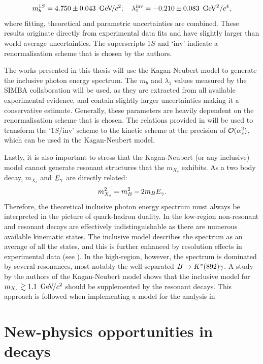 \begin{equation}\label{eq:simba_result}
    m_b^{1S} =4.750 \pm 0.043~{\mathrm{\,Ge\kern -0.1em V\!/}c^2};  \quad \lambda^{\mathrm{inv}}_1 = -0.210\pm0.083~\mathrm{\,Ge\kern -0.1em V}^2/c^4, 
\end{equation}
where fitting, theoretical and parametric uncertainties are combined.
These results originate directly from experimental data fits and have slightly larger than world average uncertainties.
The superscripts $1S$ and `$\mathrm{inv}$' indicate a renormalisation scheme that is chosen by the authors.

The works presented in this thesis will use the Kagan-Neubert model to generate the inclusive photon energy spectrum.
The $m_b$ and $\lambda_1$ values measured by the SIMBA collaboration will be used, as they are extracted from all available experimental evidence, and contain slightly larger uncertainties making it a conservative estimate.
Generally, these parameters are heavily dependent on the renormalisation scheme that is chosen.
The relations provided in \cite{Ligeti:2008ac} will be used to transform the `$1S$/$\mathrm{inv}$' scheme to the kinetic scheme at the precision of ${\cal O}(\alpha_s^2)$, which can be used in the Kagan-Neubert model.

Lastly, it is also important to stress that the Kagan-Neubert (or any inclusive) model cannot generate resonant structures that the $m_{X_s}$ exhibits.
As a two body decay, $m_{X_s}$ and ${E_{\gamma}}$ are directly related:
\begin{equation}
    m_{X_s}^2 = m_B^2 - 2m_B{E_{\gamma}}.
\end{equation}
Therefore, the theoretical inclusive photon energy spectrum must always be interpreted in the picture of quark-hadron duality.
In the low-\Egamma region non-resonant and resonant decays are effectively indistinguishable as there are numerous available kinematic states.
The inclusive model describes the spectrum as an average of all the states, and this is further enhanced by resolution effects in experimental data (see ).
In the high-\Egamma region, however, the spectrum is dominated by several resonances, most notably the well-separated $B\rightarrow K^*(892)\gamma$.
A study by the authors of the Kagan-Neubert model \cite{Kagan:1998ym} shows that the inclusive model for $m_{X_s}\gtrsim 1.1~{\mathrm{\,Ge\kern -0.1em V\!/}c^2}$ should be supplemented by the resonant decays.
This approach is followed when implementing a model for the analysis in 

\section{New-physics opportunities in \safeBtoXsgamma decays}\label{sec:btosgamma_bsm}

